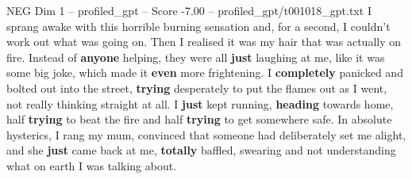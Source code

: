 \begin{textsample}{NEG Dim 1 – profiled\_gpt – Score -7.00 – profiled\_gpt/t001018\_gpt.txt}  \label{ex:f1_neg_014}
I sprang awake with this horrible burning sensation and, for a second, I couldn't work out what was going on.
Then I realised it was my hair that was actually on fire.
Instead of \textbf{anyone} helping, they were all \textbf{just} laughing at me, like it was some big joke, which made it \textbf{even} more frightening.
I \textbf{completely} panicked and bolted out into the street, \textbf{trying} desperately to put the flames out as I went, not really thinking straight at all.
I \textbf{just} kept running, \textbf{heading} towards home, half \textbf{trying} to beat the fire and half \textbf{trying} to get somewhere safe.
In absolute hysterics, I rang my mum, convinced that someone had deliberately set me alight, and she \textbf{just} came back at me, \textbf{totally} baffled, swearing and not understanding what on earth I was talking about.

\end{textsample}
